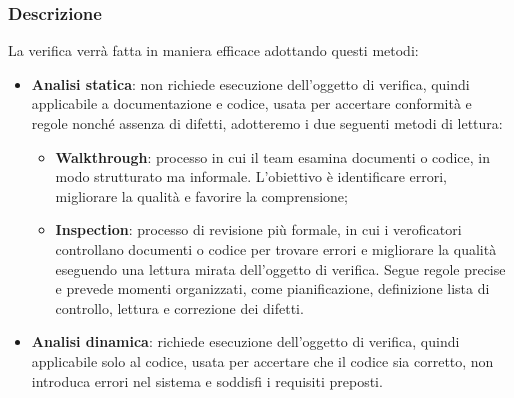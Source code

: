         \subsubsection{Descrizione}
        La verifica verrà fatta in maniera efficace adottando questi metodi:
        \begin{itemize}
            \item \textbf{Analisi statica}: non richiede esecuzione dell'oggetto di verifica, quindi applicabile a documentazione e codice, usata per accertare conformità e regole nonché assenza di difetti, adotteremo i due seguenti metodi di lettura:
             \begin{itemize}
                \item \textbf{Walkthrough}: processo in cui il team esamina documenti o codice, in modo strutturato ma informale. L'obiettivo è identificare errori, migliorare la qualità e favorire la comprensione;
                \item \textbf{Inspection}: processo di revisione più formale, in cui i veroficatori controllano documenti o codice per trovare errori e migliorare la qualità eseguendo una lettura mirata dell'oggetto di verifica. Segue regole precise e prevede momenti organizzati, come pianificazione, definizione lista di controllo, lettura e correzione dei difetti.
             \end{itemize}
             \item \textbf{Analisi dinamica}: richiede esecuzione dell'oggetto di verifica, quindi applicabile solo al codice, usata per accertare che il codice sia corretto, non introduca errori nel sistema e soddisfi i requisiti preposti.
        \end{itemize}
